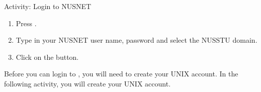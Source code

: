 \begin{frame}{Activity: Login to NUSNET}
\begin{enumerate}
\item Press .
\item Type in your NUSNET user name, password and select the NUSSTU domain.  
\item Click on the  button.  
\end{enumerate}
\end{frame}

Before you can login to , you will need to create your UNIX account.
In the following activity, you will create your UNIX account.  

